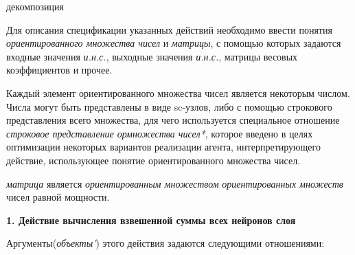 \begin{SCn}
	\begin{scnrelfromset}{декомпозиция}
	\end{scnrelfromset}
\end{SCn}

Для описания спецификации указанных действий необходимо ввести понятия \textit{ориентированного множества чисел} и \textit{матрицы}, с помощью которых задаются входные значения \textit{и.н.с.}, выходные значения \textit{и.н.с.}, матрицы весовых коэффициентов и прочее.

Каждый элемент ориентированного множества чисел является некоторым числом. Числа могут быть представлены в виде sc-узлов, либо с помощью строкового представления всего множества, для чего используется специальное отношение \textit{строковое представление ормножества чисел*}, которое введено в целях оптимизации некоторых вариантов реализации агента, интерпретирующего действие, использующее понятие ориентированного множества чисел.

\begin{SCn}
\end{SCn}

\textit{матрица} является \textit{ориентированным множеством} \textit{ориентированных множеств} чисел равной мощности.


\textbf{1. Действие вычисления взвешенной суммы всех нейронов слоя}

Аргументы(\textit{объекты'}) этого действия задаются следующими отношениями:
\begin{SCn}
\end{SCn}

\begin{SCn}
\end{SCn}

